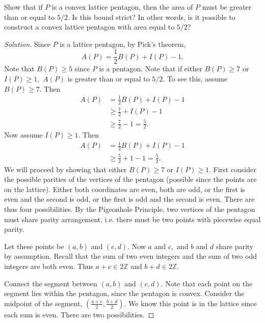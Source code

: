 \documentclass[12pt]{article}
\newcommand{\Z}{\mathbb{Z}}
\newenvironment{exercise}[2][Exercise]{\begin{trivlist}
        \item[\hskip \labelsep {\bfseries #1}\hskip \labelsep {\bfseries #2.}]}{\end{trivlist}}
\newenvironment{solution}
        {\begin{proof}[Solution]}
                    {\end{proof}}
\begin{document}
\begin{exercise}{75}
    Show that if \( P \) is a convex lattice pentagon, then the area of \( P \) must be greater than or equal to \( 5/2. \) Is this bound strict? In other words, is it possible to construct a convex lattice pentagon with area equal to \( 5/2? \)
    \begin{solution}
        Since \( P \) is a lattice pentagon, by Pick's theorem,
        \[ A(P) = \frac{1}{2} B(P) + I(P)  - 1. \]
        Note that \( B(P) \geq 5 \) since \( P \) is a pentagon. Note that if either \( B(P) \geq 7 \) or \( I(P)  \geq 1, \) \( A(P) \) is greater than or equal to \( 5/2. \) To see this, assume \( B(P) \geq 7. \) Then
        \begin{align*}
            A(P) &= \frac{1}{2} B(P) + I(P) -1\\
            &\geq \frac{7}{2} + I(P) - 1\\
            &\geq \frac{7}{2} -1 = \frac{5}{2} .
        \end{align*}
        Now assume \( I(P) \geq 1 . \) Then
        \begin{align*}
            A(P) &= \frac{1}{2} B(P) + I(P) -1\\
            &\geq \frac{5}{2} + 1 - 1 = \frac{5}{2} .
        \end{align*}
        We will proceed by showing that either \( B(P) \geq 7 \) or \( I(P) \geq 1. \) First consider the possible parities of the vertices of the pentagon (possible since the points are on the lattice). Either both coordinates are even, both are odd, or the first is even and the second is odd, or the first is odd and the second is even. There are thus four possibilities. By the Pigeonhole Principle, two vertices of the pentagon must share parity arrangement, i.e. there must be two points with piecewise equal parity.

        Let these points be \( (a,b) \) and \( (c,d) . \) Now \( a \) and \( c, \) and \( b \) and \( d \) share parity by assumption. Recall that the sum of two even integers and the sum of two odd integers are both even. Thus \( a + c \in 2\Z \) and \( b + d \in 2\Z \).

        Connect the segment between \( (a,b) \) and \( (c,d) . \) Note that each point on the segment lies within the pentagon, since the pentagon is convex. Consider the midpoint of the segment, \( (\frac{a + c}{2} , \frac{b + d}{2}) . \) We know this point is in the lattice since each sum is even. There are two possibilities.


\end{solution}
\end{exercise}
\end{document}
